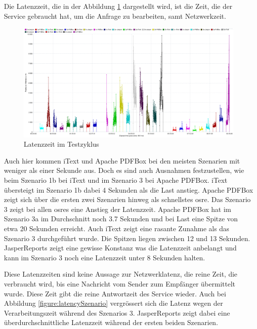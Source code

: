 \documentclass[main.tex]{subfiles}
\begin{document}
Die Latenzzeit, die in der Abbildung \ref{figure:latencyTestcycle} dargestellt wird, ist die Zeit, die der Service gebraucht hat, um die Anfrage zu bearbeiten, samt Netzwerkzeit. 


\begin{figure}[H]
\includegraphics[width=\textwidth]{mainpart/4_analyse_img/ResponseLatenciesOverTime.png}
 \caption{Latenzzeit im Testzyklus}
 \label{figure:latencyTestcycle}
\end{figure}




Auch hier kommen iText und Apache PDFBox bei den meisten Szenarien mit weniger als einer Sekunde aus. Doch es sind auch Ausnahmen festzustellen, wie beim Szenario 1b bei iText und im Szenario 3 bei Apache PDFBox. iText übersteigt im Szenario 1b dabei 4 Sekunden als die Last anstieg. Apache PDFBox zeigt sich über die ersten zwei Szenarien hinweg als schnellstes \acrshort{osre}. Das Szenario 3 zeigt bei allen \acrshort{osre}s eine Anstieg der Latenzzeit. Apache PDFBox hat im Szenario 3a im Durchschnitt noch 3.7 Sekunden und bei Last eine Spitze von etwa 20 Sekunden erreicht. Auch iText zeigt eine rasante Zunahme als das Szenario 3 durchgeführt wurde. Die Spitzen liegen zwischen 12 und 13 Sekunden. JasperReports zeigt eine gewisse Konstanz was die Latenzzeit anbelangt und kann im Szenario 3 noch eine Latenzzeit unter 8 Sekunden halten.    

Diese Latenzzeiten sind keine Aussage zur Netzwerklatenz, die reine Zeit, die verbraucht wird, bis eine Nachricht vom Sender zum Empfänger übermittelt wurde. Diese Zeit gibt die reine Antwortzeit des Service wieder. Auch bei Abbildung \ref{figure:latencySzenario} vergrössert sich die Latenz wegen der Verarbeitungszeit während des Szenarios 3. JasperReports zeigt dabei eine überdurchschnittliche Latenzzeit während der ersten beiden Szenarien.
\end{document}
